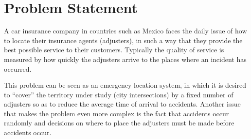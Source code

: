 \section{Problem Statement}
A car insurance company
in countries such as Mexico
faces the daily issue
of how to locate
their insurance agents (adjusters),
in such a way
that they provide
the best possible service
to their customers.
Typically
the quality of service
is measured
by how quickly
the adjusters arrive
to the places
where an incident has occurred.

This problem
can be seen
as an emergency location system, %
in which
it is desired to ``cover''
the territory under study
(city intersections)
by a fixed number of adjusters
so as to reduce
the average time
of arrival to accidents.
Another issue
that makes the problem
even more complex
is the fact
that accidents occur randomly
and decisions
on where to place the adjusters
must be made before
accidents occur.
